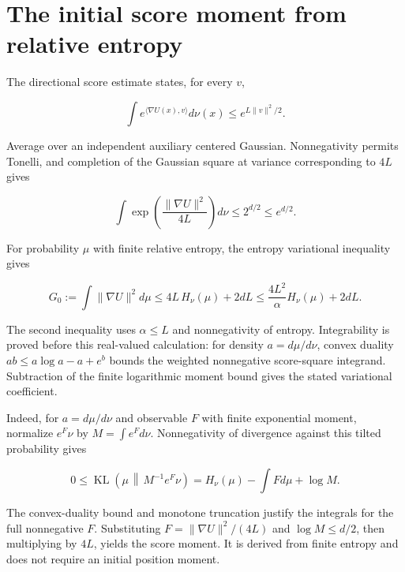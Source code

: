 \documentclass[11pt,a4paper]{report}
\begin{document}
\section{\texorpdfstring{The initial score moment from relative entropy}{The initial score moment from relative entropy}}


The directional score estimate \cite[Section~3.27.2]{LangevinLean2026ULASC} states, for every \(v\),

\[\int e^{\langle\nabla U(x),v\rangle}d\nu(x)\le e^{L\|v\|^2/2}.\]

Average over an independent auxiliary centered Gaussian. Nonnegativity permits Tonelli, and completion of the Gaussian square at variance corresponding to \(4L\) gives

\[\int\exp\!\left(\frac{\|\nabla U\|^2}{4L}\right)d\nu
\le 2^{d/2}\le e^{d/2}.\]

For probability \(\mu\) with finite relative entropy, the entropy variational inequality gives

\[G_0:=\int\|\nabla U\|^2d\mu\le4L\,H_\nu(\mu)+2dL
\le\frac{4L^2}{\alpha}H_\nu(\mu)+2dL.\]

The second inequality uses \(\alpha\le L\) and nonnegativity of entropy. Integrability is proved before this real-valued calculation: for density \(a=d\mu/d\nu\), convex duality \(ab\le a\log a-a+e^b\) bounds the weighted nonnegative score-square integrand. Subtraction of the finite logarithmic moment bound gives the stated variational coefficient.



Indeed, for \(a=d\mu/d\nu\) and observable \(F\) with finite exponential moment, normalize \(e^F\nu\) by \(M=\int e^Fd\nu\). Nonnegativity of divergence against this tilted probability gives

\[0\le\operatorname{KL}\left(\mu\,\middle\Vert\,M^{-1}e^F\nu\right)
=H_\nu(\mu)-\int Fd\mu+\log M.\]

The convex-duality bound and monotone truncation justify the integrals for the full nonnegative \(F\). Substituting \(F=\|\nabla U\|^2/(4L)\) and \(\log M\le d/2\), then multiplying by \(4L\), yields the score moment. It is derived from finite entropy and does not require an initial position moment.
\end{document}
